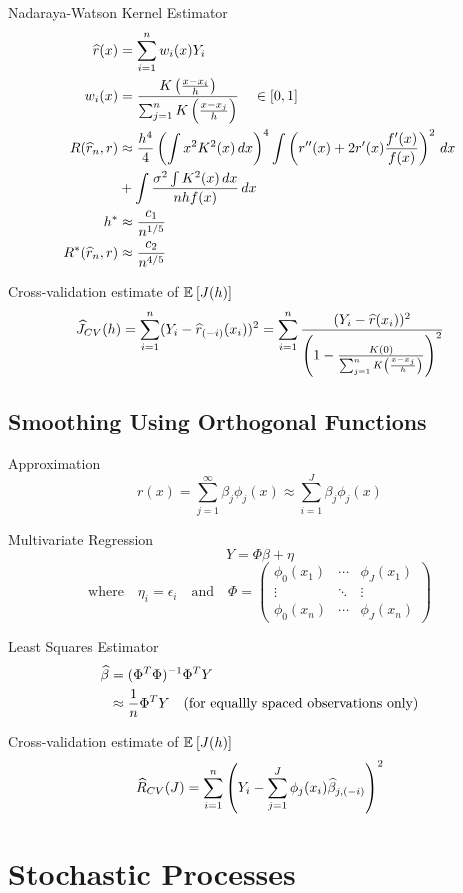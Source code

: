 \documentclass[landscape]{article}
\begin{document}
\begin{multicols*}{2}
Nadaraya-Watson Kernel Estimator
\begin{align*}
\widehat{r}(x) &= \sum_{i=1}^n w_i(x)Y_i \\
w_i(x) 
&= \frac{K\left(\frac{x-x_i}{h}\right)}{\sum_{j=1}^n K\left(\frac{x-x_j}{h}\right)} 
\quad \in [0,1] \\
R(\widehat{r}_n,r) &\approx \frac{h^4}{4} \left( \int x^2K^2(x)\,dx \right)^4
\int \left( r^{\prime\prime}(x)
+ 2r^{\prime}(x)\frac{f^{\prime}(x)}{f(x)}\right)^2 \,dx \\
&+ \int \frac{\sigma^2 \int K^2(x) \,dx}{nhf(x)}\,dx \\
h^* &\approx \frac{c_1}{n^{1/5}} \\
R^*(\widehat{r}_n,r) &\approx \frac{c_2}{n^{4/5}} \\
\end{align*}

Cross-validation estimate of $\mathbb{E}_{}\left[J(h)\right]$
$$\widehat{J}_{CV}(h) 
= \sum_{i=1}^n (Y_i - \widehat{r}_{(-i)}(x_i))^2
= \sum_{i=1}^n \frac{(Y_i - \widehat{r}(x_i))^2}{\left( 
1- \frac{K(0)}{\sum_{j=1}^n K\left(\frac{x-x_j}{h}\right)}\right)^2}$$

\subsection{Smoothing Using Orthogonal Functions}

Approximation
$$r(x) = \sum_{j=1}^\infty\beta_j\phi_j(x) 
\approx \sum_{i=1}^J \beta_j\phi_j(x)$$

Multivariate Regression
$$Y = \Phi\beta + \eta$$
$$\text{where}\quad \eta_i = \epsilon_i \quad\text{and}\quad \Phi 
= \begin{pmatrix} 
  \phi_0(x_1) & \cdots & \phi_J(x_1) \\ 
  \vdots & \ddots & \vdots \\ 
  \phi_0(x_n) & \cdots & \phi_J(x_n)
  \end{pmatrix}$$

Least Squares Estimator
\begin{align*}
\widehat{\beta} &= (\Phi^T\Phi)^{-1}\Phi^T Y \\
&\approx \frac{1}{n}\Phi^T Y \quad\text{(for equallly spaced observations only)}
\end{align*}

Cross-validation estimate of $\mathbb{E}_{}\left[J(h)\right]$
$$\widehat{R}_{CV}(J) 
= \sum_{i=1}^n \left( Y_i - \sum_{j=1}^J \phi_j(x_i)\widehat{\beta}_{j,(-i)} \right)^2$$

\section{Stochastic Processes}


\end{multicols*}
\end{document}
